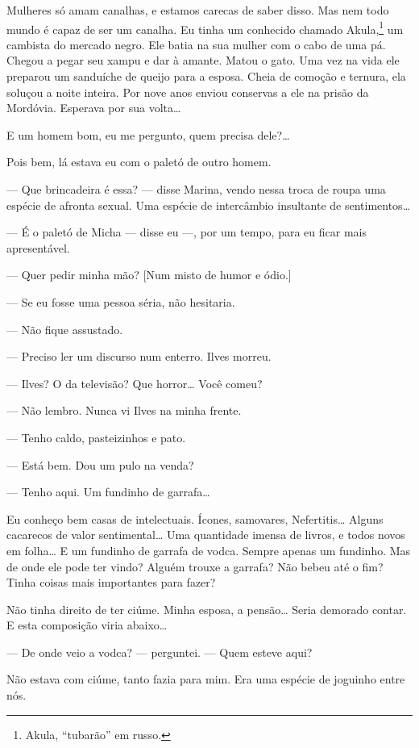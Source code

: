 Mulheres só amam canalhas, e estamos carecas de saber disso. Mas nem
todo mundo é capaz de ser um canalha. Eu tinha um conhecido chamado
Akula,\footnote{Akula, ``tubarão'' em russo.} um cambista do mercado
negro. Ele batia na sua mulher com o cabo de uma pá. Chegou a pegar seu
xampu e dar à amante. Matou o gato. Uma vez na vida ele preparou um
sanduíche de queijo para a esposa. Cheia de comoção e ternura, ela
soluçou a noite inteira. Por nove anos enviou conservas a ele na prisão
da Mordóvia. Esperava por sua volta\ldots{}

E um homem bom, eu me pergunto, quem precisa dele?\ldots{}

Pois bem, lá estava eu com o paletó de outro homem.

--- Que brincadeira é essa? --- disse Marina, vendo nessa troca de roupa
uma espécie de afronta sexual. Uma espécie de intercâmbio insultante de
sentimentos\ldots{}

--- É o paletó de Micha --- disse eu ---, por um tempo, para eu ficar
mais apresentável.

--- Quer pedir minha mão? {[}Num misto de humor e ódio.{]}

--- Se eu fosse uma pessoa séria, não hesitaria.

--- Não fique assustado.

--- Preciso ler um discurso num enterro. Ilves morreu.

--- Ilves? O da televisão? Que horror\ldots{} Você comeu?

--- Não lembro. Nunca vi Ilves na minha frente.

--- Tenho caldo, pasteizinhos e pato.

--- Está bem. Dou um pulo na venda?

--- Tenho aqui. Um fundinho de garrafa\ldots{}

Eu conheço bem casas de intelectuais. Ícones, samovares, Nefertitis\ldots{}
Alguns cacarecos de valor sentimental\ldots{} Uma quantidade imensa de
livros, e todos novos em folha\ldots{} E um fundinho de garrafa de vodca.
Sempre apenas um fundinho. Mas de onde ele pode ter vindo? Alguém trouxe
a garrafa? Não bebeu até o fim? Tinha coisas mais importantes para
fazer?

Não tinha direito de ter ciúme. Minha esposa, a pensão\ldots{} Seria demorado
contar. E esta composição viria abaixo\ldots{}

--- De onde veio a vodca? --- perguntei. --- Quem esteve aqui?

Não estava com ciúme, tanto fazia para mim. Era uma espécie de joguinho
entre nós.

